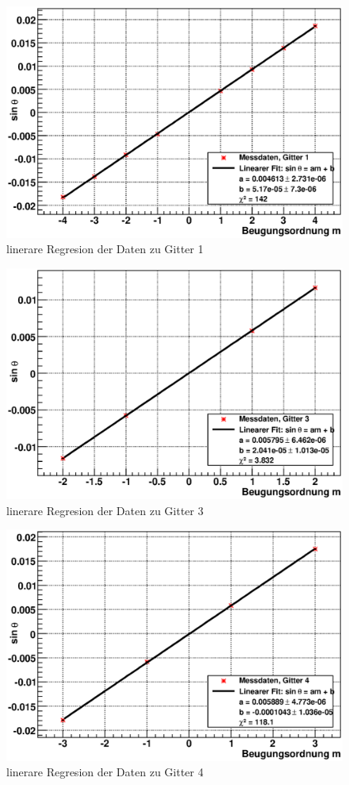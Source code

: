 \documentclass[12pt]{article}
\begin{document}
\begin{figure}[H]  
\centering
\includegraphics[width=0.7\linewidth]{pictures/gitter1.eps}
\caption{linerare Regresion der Daten zu Gitter 1}
\end{figure}

\begin{figure}[H]  
\centering
\includegraphics[width=0.7\linewidth]{pictures/gitter3.eps}
\caption{linerare Regresion der Daten zu Gitter 3}
\end{figure}

\begin{figure}[H]  
\centering
\includegraphics[width=0.7\linewidth]{pictures/gitter4.eps}
\caption{linerare Regresion der Daten zu Gitter 4}
\end{figure}
\end{document}
